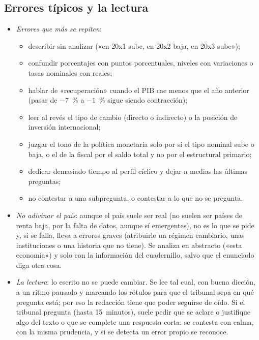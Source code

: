 \documentclass[11pt]{article}
\begin{document}
\subsection{Errores típicos y la lectura}\label{anexo:errores}

\begin{itemize}
\item \emph{Errores que más se repiten}:
  \begin{itemize}
  \item describir sin analizar («en 20x1 sube, en 20x2 baja, en 20x3 sube»);
  \item confundir porcentajes con puntos porcentuales, niveles con variaciones o tasas nominales con reales;
  \item hablar de «recuperación» cuando el PIB cae menos que el año anterior (pasar de $-7$~\% a $-1$~\% sigue siendo contracción);
  \item leer al revés el tipo de cambio (directo o indirecto) o la posición de inversión internacional;
  \item juzgar el tono de la política monetaria solo por si el tipo nominal sube o baja, o el de la fiscal por el saldo total y no por el estructural primario;
  \item dedicar demasiado tiempo al perfil cíclico y dejar a medias las últimas preguntas;
  \item no contestar a una subpregunta, o contestar a lo que no se pregunta.
  \end{itemize}
\item \emph{No adivinar el país}: aunque el país suele ser real (no suelen ser países de renta baja, por la falta de datos, aunque sí emergentes), no es lo que se pide y, si se falla, lleva a errores graves (atribuirle un régimen cambiario, unas instituciones o una historia que no tiene). Se analiza en abstracto («esta economía») y solo con la información del cuadernillo, salvo que el enunciado diga otra cosa.
\item \emph{La lectura}: lo escrito no se puede cambiar. Se lee tal cual, con buena dicción, a un ritmo pausado y marcando los rótulos para que el tribunal sepa en qué pregunta está; por eso la redacción tiene que poder seguirse de oído. Si el tribunal pregunta (hasta 15~minutos), suele pedir que se aclare o justifique algo del texto o que se complete una respuesta corta: se contesta con calma, con la misma prudencia, y si se detecta un error propio se reconoce.
\end{itemize}
\end{document}
